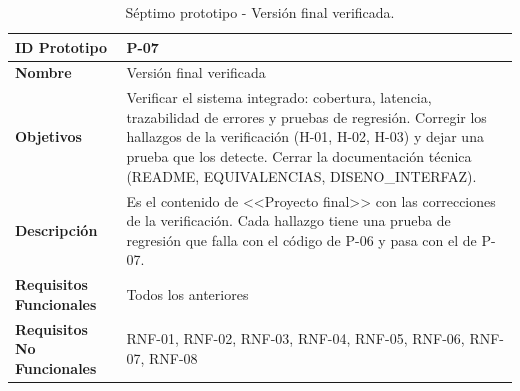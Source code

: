 \begin{table}[H]
\centering
\caption{Séptimo prototipo - Versión final verificada.}
\label{tab:prototipo-p07}
\small
\begin{tabularx}{\textwidth}{>{\bfseries}l X}
\toprule
ID Prototipo & P-07 \\ \midrule
Nombre & Versión final verificada \\ \midrule
Objetivos & Verificar el sistema integrado: cobertura, latencia, trazabilidad de errores y pruebas de regresión. \newline Corregir los hallazgos de la verificación (H-01, H-02, H-03) y dejar una prueba que los detecte. \newline Cerrar la documentación técnica (README, EQUIVALENCIAS, DISENO\_INTERFAZ). \\ \midrule
Descripción & Es el contenido de <<Proyecto final>> con las correcciones de la verificación. Cada hallazgo tiene una prueba de regresión que falla con el código de P-06 y pasa con el de P-07. \\ \midrule
Requisitos Funcionales & Todos los anteriores \\ \midrule
Requisitos No Funcionales & RNF-01, RNF-02, RNF-03, RNF-04, RNF-05, RNF-06, RNF-07, RNF-08 \\ \bottomrule
\end{tabularx}
\end{table}
